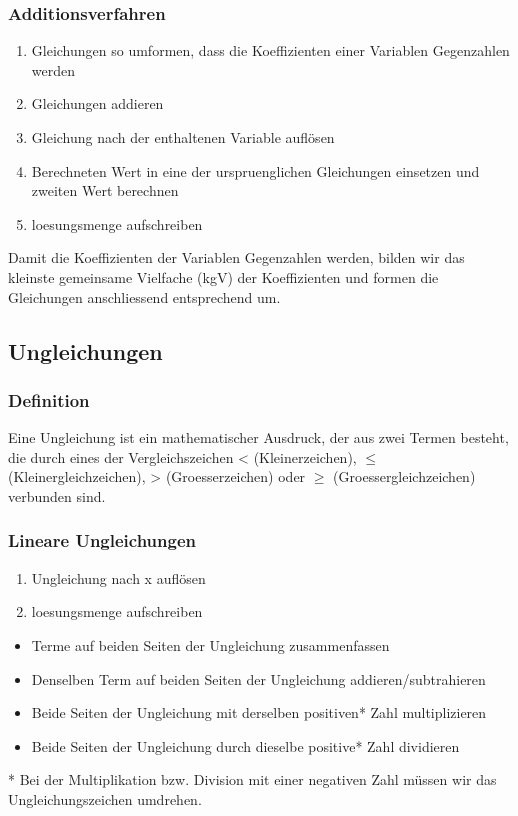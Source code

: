 \begin{multicols}{2}
    \subsubsection{Additionsverfahren}
    \vspace{-4mm}
    \begin{enumerate}
        \item     Gleichungen so umformen, dass die Koeffizienten einer Variablen Gegenzahlen werden
        \item     Gleichungen addieren
        \item     Gleichung nach der enthaltenen Variable auflösen
        \item     Berechneten Wert in eine der urspruenglichen Gleichungen einsetzen und zweiten Wert berechnen
        \item     loesungsmenge aufschreiben
    \end{enumerate}
    Damit die Koeffizienten der Variablen Gegenzahlen werden, bilden wir das kleinste gemeinsame Vielfache (kgV) der Koeffizienten und formen die Gleichungen anschliessend entsprechend um.

    \subsection{Ungleichungen}
    \vspace{-4mm}
    \subsubsection{Definition}
    \vspace{-4mm}
    Eine Ungleichung ist ein mathematischer Ausdruck, der aus zwei Termen besteht, die durch eines der Vergleichszeichen < (Kleinerzeichen), $\leq$ (Kleinergleichzeichen),
    > (Groesserzeichen) oder $\geq$ (Groessergleichzeichen) verbunden sind.
    \subsubsection{Lineare Ungleichungen}
    \vspace{-4mm}
    \begin{enumerate}
        \item Ungleichung nach x auflösen
        \item loesungsmenge aufschreiben
    \end{enumerate}
    \begin{itemize}
        \item Terme auf beiden Seiten der Ungleichung zusammenfassen
        \item Denselben Term auf beiden Seiten der Ungleichung addieren/subtrahieren
        \item Beide Seiten der Ungleichung mit derselben positiven* Zahl multiplizieren
        \item Beide Seiten der Ungleichung durch dieselbe positive* Zahl dividieren
    \end{itemize}
    * Bei der Multiplikation bzw. Division mit einer negativen Zahl müssen wir das Ungleichungszeichen umdrehen.\\~\\


\end{multicols}
